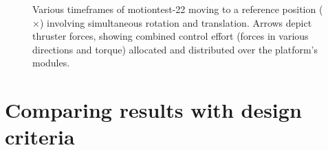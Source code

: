  \begin{figure}[H]
	\centering
\end{figure}

\begin{figure}[H]
	\centering
	\caption{Various timeframes of motiontest-22 moving to a reference position ($\times$) involving simultaneous rotation and translation. Arrows depict thruster forces, showing combined control effort (forces in various directions and torque) allocated and distributed over the platform's modules.}
	\label{fig:3x3_forcePlatformMotionIllustrative}
\end{figure}

\section{Comparing results with design criteria}

